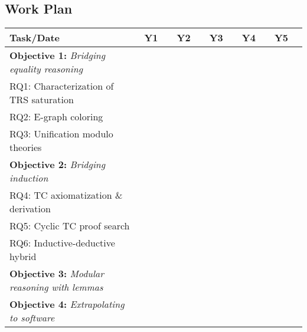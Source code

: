 \subsection*{Work Plan}

\newcommand\yrsz{5mm}

\begin{tabular}
{|l|p{\yrsz}p{\yrsz}|p{\yrsz}p{\yrsz}|p{\yrsz}p{\yrsz}|p{\yrsz}p{\yrsz}|p{\yrsz}p{\yrsz}|}
\hline
Task/Date & Y1 & & Y2 & & Y3 & & Y4 & & Y5 & \\ \hline
\textbf{Objective 1:} \textit{Bridging equality reasoning} \\
RQ1: Characterization of TRS saturation \\
RQ2: E-graph coloring \\
RQ3: Unification modulo theories \\
\textbf{Objective 2:} \textit{Bridging induction} \\
RQ4: TC axiomatization \& derivation \\
RQ5: Cyclic TC proof search \\
RQ6: Inductive-deductive hybrid \\
\textbf{Objective 3:} \textit{Modular reasoning with lemmas} \\
\textbf{Objective 4:} \textit{Extrapolating to software} \\
\hline
\end{tabular}

